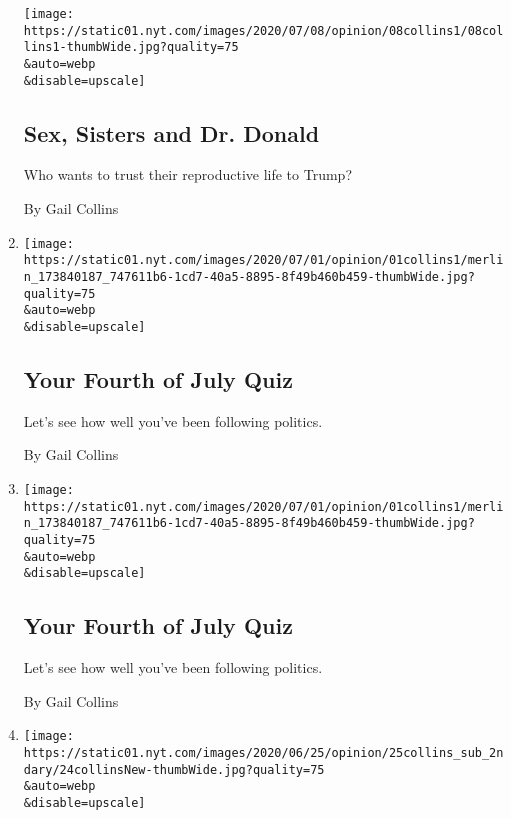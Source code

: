 \begin{enumerate}
  \texttt{[image: https://static01.nyt.com/images/2020/07/08/opinion/08collins1/08collins1-thumbWide.jpg?quality=75\\\&auto=webp\\\&disable=upscale]}

  \hypertarget{sex-sisters-and-dr-donald}{%
  \subsection{Sex, Sisters and Dr.
  Donald}\label{sex-sisters-and-dr-donald}}

  Who wants to trust their reproductive life to Trump?

  By Gail Collins
\item
  \href{/interactive/2020/07/01/opinion/4th-of-july-quiz.html}{}

  \texttt{[image: https://static01.nyt.com/images/2020/07/01/opinion/01collins1/merlin\_173840187\_747611b6-1cd7-40a5-8895-8f49b460b459-thumbWide.jpg?quality=75\\\&auto=webp\\\&disable=upscale]}

  \hypertarget{your-fourth-of-july-quiz}{%
  \subsection{Your Fourth of July Quiz}\label{your-fourth-of-july-quiz}}

  Let's see how well you've been following politics.

  By Gail Collins
\item
  \href{/interactive/2020/07/01/opinion/4th-of-july-quiz.html}{}

  \texttt{[image: https://static01.nyt.com/images/2020/07/01/opinion/01collins1/merlin\_173840187\_747611b6-1cd7-40a5-8895-8f49b460b459-thumbWide.jpg?quality=75\\\&auto=webp\\\&disable=upscale]}

  \hypertarget{your-fourth-of-july-quiz-1}{%
  \subsection{Your Fourth of July
  Quiz}\label{your-fourth-of-july-quiz-1}}

  Let's see how well you've been following politics.

  By Gail Collins
\item
  \href{/2020/06/24/opinion/trump-tulsa-2020.html}{}

  \texttt{[image: https://static01.nyt.com/images/2020/06/25/opinion/25collins\_sub\_2ndary/24collinsNew-thumbWide.jpg?quality=75\\\&auto=webp\\\&disable=upscale]}

  \hypertarget{trump-speaks-and-speaks-and-speaks-}{%
}
\end{enumerate}
